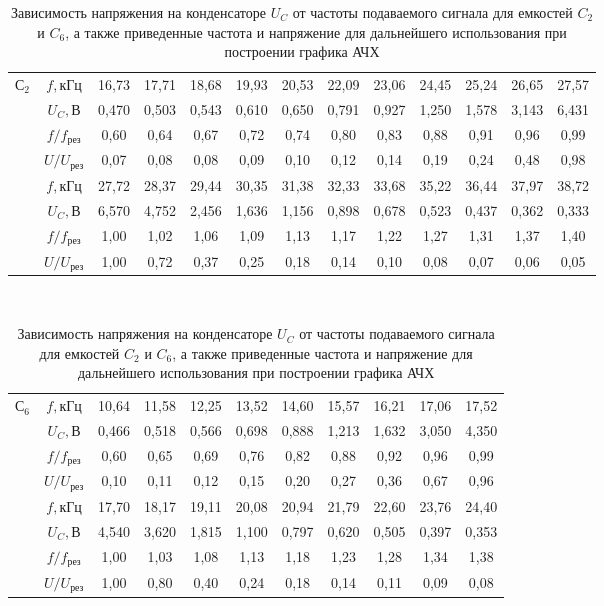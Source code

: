 \documentclass{lab}
\begin{document}
\begin{enumerate}
\begin{table}[H]
	{\small 
	\begin{tabular}{|c|c|ccccccccccc|}
		\hline
		\multirow{8}{*}{$С_2$}
		&$f, кГц$		&16,73	&17,71	&18,68	&19,93	&20,53	&22,09	&23,06	&24,45	&25,24	&26,65	&27,57	\\
		&$U_C, В$		&0,470	&0,503	&0,543	&0,610	&0,650	&0,791	&0,927	&1,250	&1,578	&3,143	&6,431	\\
		&$f/f_{рез}$	&0,60	&0,64	&0,67	&0,72	&0,74	&0,80	&0,83	&0,88	&0,91	&0,96	&0,99	\\
		&$U/U_{рез}$	&0,07	&0,08	&0,08	&0,09	&0,10	&0,12	&0,14	&0,19	&0,24	&0,48	&0,98	\\ \cline{2-13}
		&$f, кГц$		&27,72	&28,37	&29,44	&30,35	&31,38	&32,33	&33,68	&35,22	&36,44	&37,97	&38,72	\\
		&$U_C, В$		&6,570	&4,752	&2,456	&1,636	&1,156	&0,898	&0,678	&0,523	&0,437	&0,362	&0,333	\\
		&$f/f_{рез}$	&1,00	&1,02	&1,06	&1,09	&1,13	&1,17	&1,22	&1,27	&1,31	&1,37	&1,40	\\
		&$U/U_{рез}$	&1,00	&0,72	&0,37	&0,25	&0,18	&0,14	&0,10	&0,08	&0,07	&0,06	&0,05	\\ \hline
	\end{tabular}
\\[1pt]
	\begin{tabular}{|c|c|ccccccccc|}
		\hline
		\multirow{8}{*}{$С_6$}
		&$f, кГц$		&10,64	&11,58	&12,25	&13,52	&14,60	&15,57	&16,21	&17,06	&17,52	\\
		&$U_C, В$		&0,466	&0,518	&0,566	&0,698	&0,888	&1,213	&1,632	&3,050	&4,350	\\
		&$f/f_{рез}$	&0,60	&0,65	&0,69	&0,76	&0,82	&0,88	&0,92	&0,96	&0,99	\\
		&$U/U_{рез}$	&0,10	&0,11	&0,12	&0,15	&0,20	&0,27	&0,36	&0,67	&0,96	\\ \cline{2-11}
		&$f, кГц$		&17,70	&18,17	&19,11	&20,08	&20,94	&21,79	&22,60	&23,76	&24,40	\\
		&$U_C, В$		&4,540	&3,620	&1,815	&1,100	&0,797	&0,620	&0,505	&0,397	&0,353	\\
		&$f/f_{рез}$	&1,00	&1,03	&1,08	&1,13	&1,18	&1,23	&1,28	&1,34	&1,38	\\
		&$U/U_{рез}$	&1,00	&0,80	&0,40	&0,24	&0,18	&0,14	&0,11	&0,09	&0,08	\\ \hline
	\end{tabular}
	}
	\caption{\footnotesize 
	Зависимость напряжения на конденсаторе $ U_C $ от частоты подаваемого сигнала для емкостей
	$ C_2 $ и $ C_6 $, а также приведенные частота и напряжение для дальнейшего использования
	при построении графика АЧХ
	}
	\label{tabAFC}
\end{table}


\end{enumerate}
\end{document}
